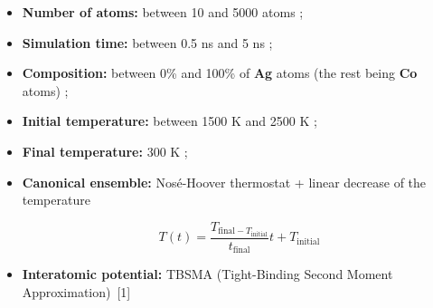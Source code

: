 \begin{columns}
     {
        
        \vspace{0.5cm}

        \begin{itemize}
            \item \textbf{Number of atoms:} between 10 and 5000 atoms ;
    
            \vspace{0.5cm}
    
            \item \textbf{Simulation time:} between 0.5 ns and 5 ns ;
            
            \vspace{0.5cm}
    
            \item \textbf{Composition:} between 0\% and 100\% of \textcolor{colorAg}{\textbf{Ag}} atoms (the rest being \textcolor{colorCo}{\textbf{Co}} atoms) ;

            \vspace{0.5cm}

            \item \textbf{Initial temperature:} between 1500 K and 2500 K ;

            \vspace{0.5cm}

            \item \textbf{Final temperature:} 300 K ;

            \vspace{0.5cm}

            \item \textbf{Canonical ensemble:} Nosé-Hoover thermostat + linear decrease of the temperature            
                
                \vspace{1cm}
            
                \begin{equation}
                    T(t) = \frac{T_{\text{final} - T_\text{initial}}}{t_{\text{final}}}t + T_\text{initial}
                \end{equation}            

            \vspace{1.5cm}

            \item \textbf{Interatomic potential:} TBSMA (Tight-Binding Second Moment Approximation)~[1] 
                

\end{itemize}}
\end{columns}

